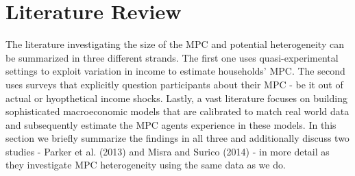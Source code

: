 \section{Literature Review} \label{sec:lit}
The literature investigating the size of the MPC and potential heterogeneity can be summarized in three different strands. The first one uses quasi-experimental settings to exploit variation in income to estimate households' MPC. The second uses surveys that explicitly question participants about their MPC - be it out of actual or hyopthetical income shocks. Lastly, a vast literature focuses on building sophisticated macroeconomic models that are calibrated to match real world data and subsequently estimate the MPC agents experience in these models. In this section we briefly summarize the findings in all three and additionally discuss two studies - Parker et al. (2013) and Misra and Surico (2014) - in more detail as they investigate MPC heterogeneity using the same data as we do. \\
